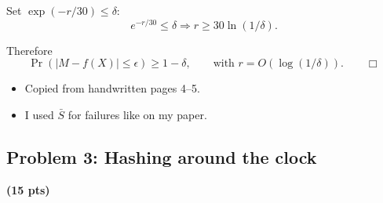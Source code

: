 \documentclass[10pt]{article}
\newcommand{\spara}[1]{\vspace{.5em}\noindent {\large\sffamily\textcolor{nyuOfficialPurple}{#1}}}
\begin{document}
Set $\exp(-r/30)\le \delta$:
\[
e^{-r/30}\le \delta
\Rightarrow
r\ge 30\ln(1/\delta).
\]

Therefore
\[
\Pr(|M-f(X)|\le \epsilon)\ge 1-\delta,
\qquad
\text{with } r=O(\log(1/\delta)).
\qquad \Box
\]

\spara{Notes for Problem 2}
\begin{itemize}
\item Copied from handwritten pages 4--5.
\item I used $\bar{S}$ for failures like on my paper.
\end{itemize}



\subsection{Problem 3: Hashing around the clock}
\textbf{(15 pts)}
\end{document}
